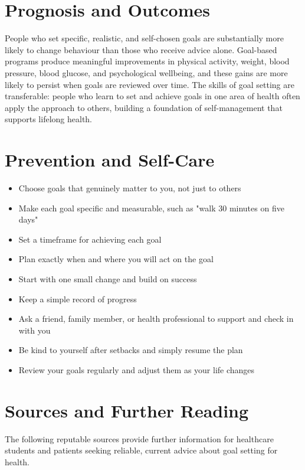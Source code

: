 \section*{Prognosis and Outcomes}
People who set specific, realistic, and self-chosen goals are substantially more likely to change behaviour than those who receive advice alone. Goal-based programs produce meaningful improvements in physical activity, weight, blood pressure, blood glucose, and psychological wellbeing, and these gains are more likely to persist when goals are reviewed over time. The skills of goal setting are transferable: people who learn to set and achieve goals in one area of health often apply the approach to others, building a foundation of self-management that supports lifelong health.

\section*{Prevention and Self-Care}
\begin{itemize}
    \item Choose goals that genuinely matter to you, not just to others
    \item Make each goal specific and measurable, such as "walk 30 minutes on five days"
    \item Set a timeframe for achieving each goal
    \item Plan exactly when and where you will act on the goal
    \item Start with one small change and build on success
    \item Keep a simple record of progress
    \item Ask a friend, family member, or health professional to support and check in with you
    \item Be kind to yourself after setbacks and simply resume the plan
    \item Review your goals regularly and adjust them as your life changes
\end{itemize}

\section*{Sources and Further Reading}
The following reputable sources provide further information for healthcare students and patients seeking reliable, current advice about goal setting for health.

